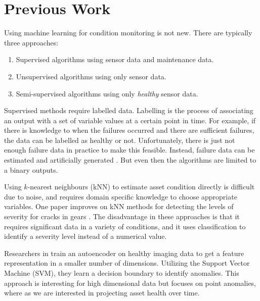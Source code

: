 \section{Previous Work}

Using machine learning for condition monitoring is not new.
There are typically three approaches:
\begin{enumerate}
	\item Supervised algorithms using sensor data and maintenance data.
    \item Unsupervised algorithms using only sensor data.
    \item Semi-supervised algorithms using only \textit{healthy} sensor data.
\end{enumerate}

Supervised methods require labelled data.
Labelling is the process of associating an output with a set of variable values at a certain point in time.
For example, if there is knowledge to when the failures occurred and there are sufficient failures, the data can be labelled as healthy or not.
Unfortunately, there is just not enough failure data in practice to make this feasible.
Instead, failure data can be estimated and artificially generated \cite{Sotiris2010AnomalyDT}.
But even then the algorithms are limited to a binary outputs.

Using $k$-nearest neighbours (kNN) to estimate asset condition directly is difficult due to noise, and requires domain specific knowledge to choose appropriate variables.
One paper improves on kNN methods for detecting the levels of severity for cracks in gears \cite{lei2009gear}.
The disadvantage in these approaches is that it requires significant data in a variety of conditions, and it uses classification to identify a severity level instead of a numerical value.

Researchers in \cite{opt} train an autoencoder on healthy imaging data to get a feature representation in a smaller number of dimensions.
Utilizing the Support Vector Machine (SVM), they learn a decision boundary to identify anomalies.
This approach is interesting for high dimensional data but focuses on point anomalies, where as we are interested in projecting asset health over time.

